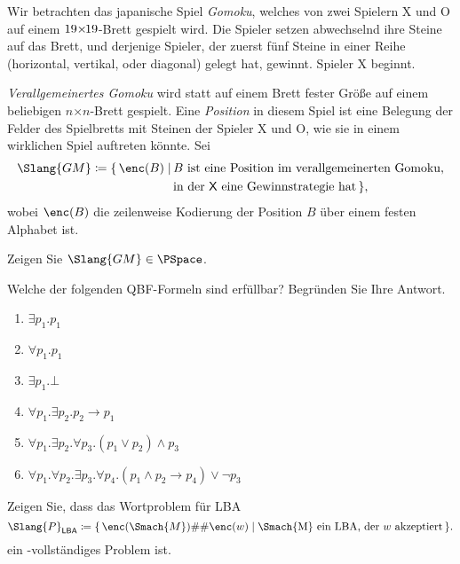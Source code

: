 \documentclass[german]{latteachCD}[2017/03/28]
\begin{document}
\begin{exercise}
  Wir betrachten das japanische Spiel \emph{Gomoku}, welches von zwei Spielern
  \textsf{X} und \textsf{O} auf einem $19{\times}\mskip-2mu19$-Brett %
  gespielt wird.  Die Spieler setzen abwechselnd ihre Steine auf das Brett, und
  derjenige Spieler, der zuerst fünf Steine in einer Reihe (horizontal,
  vertikal, oder diagonal) gelegt hat, gewinnt.  Spieler \textsf{X} beginnt.

  \emph{Verallgemeinertes Gomoku} wird statt auf einem Brett fester Größe auf
  einem beliebigen $n\mathord{\times}n$-Brett gespielt.  Eine \emph{Position} in
  diesem Spiel ist eine Belegung der Felder des Spielbretts mit Steinen der
  Spieler \textsf{X} und \textsf{O}, wie sie in einem wirklichen Spiel auftreten
  könnte.  Sei
  \begin{align*}
    \Slang{GM} \coloneqq \{\,\enc(B) \mid \, %
    & B \text{ ist eine Position im verallgemeinerten Gomoku,} \\
    & \text{in der \textsf{X} eine Gewinnstrategie hat}\,\},
  \end{align*}
  wobei $\enc(B)$ die zeilenweise Kodierung der Position $B$ über einem festen
  Alphabet ist.

  Zeigen Sie $\Slang{GM} \in \PSpace$.
\end{exercise}

\begin{exercise}
  Welche der folgenden QBF-Formeln sind erfüllbar?  Begründen Sie Ihre Antwort.
  \begin{enumerate}
  \item $\exists p_{1}. p_{1}$
  \item $\forall p_{1}. p_{1}$
  \item $\exists p_{1}. \bot$
  \item $\forall p_{1}. \exists p_{2}. p_{2} \to p_{1}$
  \item $\forall p_{1}. \exists p_{2}. \forall p_{3}. (p_{1} \lor p_{2}) \land
    p_{3}$
  \item $\forall p_{1}. \forall p_{2}. \exists p_{3}. \forall p_{4}. (p_{1}
    \land p_{2} \to p_{4}) \lor \lnot p_{3}$
  \end{enumerate}

\end{exercise}

\begin{exercise}
  Zeigen Sie, dass das Wortproblem für LBA
  \begin{equation*}
    \Slang{P}_{\mathsf{LBA}} \coloneqq \{\,\enc(\Smach{M})\#\#\enc(w) \mid
    \text{\Smach{M} ein LBA, der $w$ akzeptiert} \,\}.
  \end{equation*}
  ein \PSpace-vollständiges Problem ist.
\end{exercise}
\end{document}
